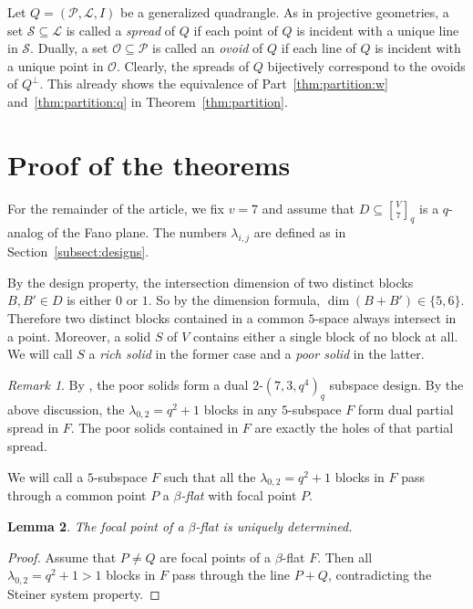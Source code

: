 \documentclass[a4paper,abstracton,12pt]{scrartcl}
\newcommand{\qbinom}[3]{\genfrac{[}{]}{0pt}{}{#1}{#2}_{#3}}
\newtheorem{lemma}{Lemma}[section]
\theoremstyle{definition}
\theoremstyle{remark}
\newtheorem{remark}[lemma]{Remark}
\begin{document}
Let $Q = (\mathcal{P},\mathcal{L},I)$ be a generalized quadrangle.
As in projective geometries, a set $\mathcal{S} \subseteq \mathcal{L}$ is called a \emph{spread} of $Q$ if each point of $Q$ is incident with a unique line in $\mathcal{S}$.
Dually, a set $\mathcal{O} \subseteq \mathcal{P}$ is called an \emph{ovoid} of $Q$ if each line of $Q$ is incident with a unique point in $\mathcal{O}$.
Clearly, the spreads of $Q$ bijectively correspond to the ovoids of $Q^\perp$.
This already shows the equivalence of Part~\ref{thm:partition:w} and~\ref{thm:partition:q} in Theorem~\ref{thm:partition}.

\section{Proof of the theorems}
For the remainder of the article, we fix $v = 7$ and assume that $D \subseteq \qbinom{V}{7}{q}$ is a $q$-analog of the Fano plane.
The numbers $\lambda_{i,j}$ are defined as in Section~\ref{subsect:designs}.

By the design property, the intersection dimension of two distinct blocks $B,B'\in D$ is either $0$ or $1$.
So by the dimension formula, $\dim(B + B') \in \{5,6\}$.
Therefore two distinct blocks contained in a common $5$-space always intersect in a point.
Moreover, a solid $S$ of $V$ contains either a single block of no block at all.
We will call $S$ a \emph{rich solid} in the former case and a \emph{poor solid} in the latter.

\begin{remark}
By \cite[Remark~4.2]{Kiermaier-Pavcevic-2015-JCD23[11]:463-480}, the poor solids form a dual $2$-$(7,3,q^4)_q$ subspace design.
By the above discussion, the $\lambda_{0,2} = q^2 + 1$ blocks in any $5$-subspace $F$ form dual partial spread in $F$.
The poor solids contained in $F$ are exactly the holes of that partial spread.
\end{remark}

We will call a $5$-subspace $F$ such that all the $\lambda_{0,2} = q^2 + 1$ blocks in $F$ pass through a common point $P$ a \emph{$\beta$-flat} with focal point $P$.

\begin{lemma}
	The focal point of a $\beta$-flat is uniquely determined.
\end{lemma}

\begin{proof}
	Assume that $P \neq Q$ are focal points of a $\beta$-flat $F$.
	Then all $\lambda_{0,2} = q^2 + 1 > 1$ blocks in $F$ pass through the line $P + Q$, contradicting the Steiner system property.
\end{proof}
\end{document}
